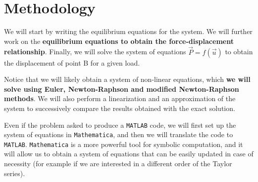 \section{Methodology}
\label{sec:methodology}

We will start by writing the equilibrium equations for the system.
We will further work on the \textbf{equilibrium equations to obtain the force-displacement relationship}.
Finally, we will solve the system of equations ${\vec{P}} = f({\vec{u}})$ to obtain the displacement of point B for a given load.

Notice that we will likely obtain a system of non-linear equations, which \textbf{we will solve using Euler, Newton-Raphson and modified Newton-Raphson methods}.
We will also perform a linearization and an approximation of the system to successively compare the results obtained with the exact solution.

Even if the problem asked to produce a \texttt{MATLAB} code, we will first set up the system of equations in \texttt{Mathematica}, and then we will translate the code to \texttt{MATLAB}.
\texttt{Mathematica} is a more powerful tool for symbolic computation, and it will allow us to obtain a system of equations that can be easily updated in case of necessity (for example if we are interested in a different order of the Taylor series).
